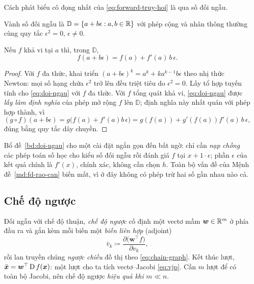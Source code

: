 Cách phát biểu cô đọng nhất của \eqref{eq:forward-truy-hoi} là qua số đối ngẫu.
 
\begin{definition}
\label{def:doi-ngau}
Vành số đối ngẫu là $\mathbb{D} = \{ a + b\epsilon : a,b \in \mathbb{R} \}$ với phép
cộng và nhân thông thường cùng quy tắc $\epsilon^2 = 0$, $\epsilon \neq 0$.
\end{definition}
 
\begin{bode}
\label{bd:doi-ngau}
Nếu $f$ khả vi tại $a$ thì, trong $\mathbb{D}$,
\begin{equation}
f(a + b\epsilon) = f(a) + f'(a)\, b\, \epsilon .
\label{eq:doi-ngau}
\end{equation}
\end{bode}
 
\begin{proof}
Với $f$ đa thức, khai triển $(a+b\epsilon)^k = a^k + k a^{k-1}b\epsilon$ theo
nhị thức Newton: mọi số hạng chứa $\epsilon^2$ trở lên đều triệt tiêu do
$\epsilon^2 = 0$. Lấy tổ hợp tuyến tính cho \eqref{eq:doi-ngau} với $f$ đa thức.
Với $f$ tổng quát khả vi, \eqref{eq:doi-ngau} được \emph{lấy làm định nghĩa} của
phép mở rộng $f$ lên $\mathbb{D}$; định nghĩa này nhất quán với phép hợp thành,
vì
\[
(g\circ f)(a+b\epsilon) = g\big(f(a) + f'(a)b\,\epsilon\big)
 = g(f(a)) + g'(f(a))f'(a)\,b\,\epsilon,
\]
đúng bằng quy tắc dây chuyền.
\end{proof}
 
Bổ đề~\ref{bd:doi-ngau} cho một cài đặt ngắn gọn đến bất ngờ: chỉ cần \emph{nạp
chồng} các phép toán số học cho kiểu số đối ngẫu rồi đánh giá $f$ tại
$x + 1\cdot\epsilon$; phần $\epsilon$ của kết quả chính là $f'(x)$, chính xác,
không cần chọn $h$. Toàn bộ vấn đề của Mệnh đề~\ref{md:fd-rao-can} biến mất, vì
ở đây không có phép trừ hai số gần nhau nào cả.
 
\subsection{Chế độ ngược}
\label{subsec:reverse-mode}
 
Đối ngẫu với chế độ thuận, \emph{chế độ ngược} cố định một vectơ mầm
$\bm{w} \in \mathbb{R}^m$ ở phía đầu ra và gắn kèm mỗi biến một \emph{biến liên hợp}
(adjoint)
\begin{equation}
\bar{v}_k \coloneqq \frac{\partial \big(\bm{w}^{\top} f\big)}{\partial v_k},
\label{eq:adjoint}
\end{equation}
rồi lan truyền chúng \emph{ngược chiều} đồ thị theo \eqref{eq:chain-graph}. Kết
thúc lượt, $\bar{\bm{x}} = \bm{w}^{\top}\operatorname{D} f(\bm{x})$: một lượt cho ta tích
vectơ--Jacobi \eqref{eq:vjp}. Cần $m$ lượt để có toàn bộ Jacobi, nên chế độ ngược
\emph{hiệu quả khi $m \ll n$}.
 

